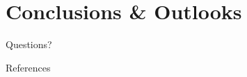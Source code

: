 \documentclass[aspectratio=169,10pt]{beamer}
\begin{document}
%  
%
%  

\section{Conclusions \& Outlooks}


\begin{frame}[t,standout]
\Large
Questions?
\end{frame}


\begin{frame}{References}
    \nocite{*}
    
    
\end{frame}
\end{document}

